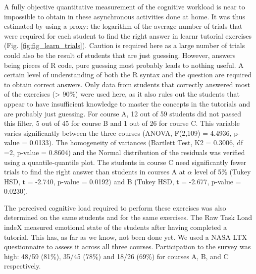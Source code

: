 \documentclass{aims}
\theoremstyle{definition}
\begin{document}
A fully objective quantitative measurement of the cognitive workload is
near to impossible to obtain in these asynchronous activities done at
home. It was thus estimated by using a proxy: the logarithm of the
average number of trials that were required for each student to find the
right answer in learnr tutorial exercises (Fig.
\ref {fig:fig_learn_trials}). Caution is required here as a large number
of trials could also be the result of students that are just guessing.
However, answers being pieces of R code, pure guessing most probably
leads to nothing useful. A certain level of understanding of both the R
syntax and the question are required to obtain correct answers. Only
data from students that correctly answered most of the exercises
(\textgreater{} 90\%) were used here, as it also rules out the students
that appear to have insufficient knowledge to master the concepts in the
tutorials and are probably just guessing. For course A, 12 out of 59
students did not passed this filter, 5 out of 45 for course B and 1 out
of 26 for course C. This variable varies significantly between the three
courses (ANOVA, F(2,109) = 4.4936, p-value = 0.0133). The homogeneity of
variances (Bartlett Test, K2 = 0.3006, df =2, p-value = 0.8604) and the
Normal distribution of the residuals was verified using a
quantile-quantile plot. The students in course C need significantly
fewer trials to find the right answer than students in courses A at
\(\alpha\) level of 5\% (Tukey HSD, t = -2.740, p-value = 0.0192) and B
(Tukey HSD, t = -2.677, p-value = 0.0230).

The perceived cognitive load required to perform these exercises was
also determined on the same students and for the same exercises. The Raw
Task Load indeX measured emotional state of the students after having
completed a tutorial. This has, as far as we know, not been done yet. We
used a NASA LTX questionnaire to assess it across all three courses.
Participation to the survey was high: 48/59 (81\%), 35/45 (78\%) and
18/26 (69\%) for courses A, B, and C respectively.
\end{document}
